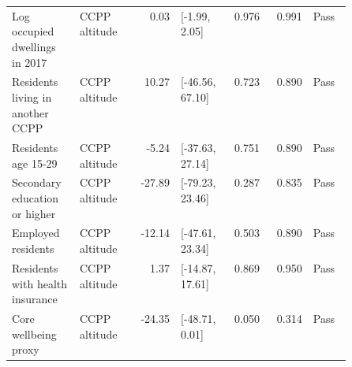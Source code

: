 \begin{longtable}{@{}p{0.20\linewidth}p{0.16\linewidth}rp{0.14\linewidth}rrl@{}}
Log occupied dwellings in 2017 & CCPP altitude & 0.03 & [-1.99, 2.05] & 0.976 & 0.991 & Pass \\
Residents living in another CCPP & CCPP altitude & 10.27 & [-46.56, 67.10] & 0.723 & 0.890 & Pass \\
Residents age 15-29 & CCPP altitude & -5.24 & [-37.63, 27.14] & 0.751 & 0.890 & Pass \\
Secondary education or higher & CCPP altitude & -27.89 & [-79.23, 23.46] & 0.287 & 0.835 & Pass \\
Employed residents & CCPP altitude & -12.14 & [-47.61, 23.34] & 0.503 & 0.890 & Pass \\
Residents with health insurance & CCPP altitude & 1.37 & [-14.87, 17.61] & 0.869 & 0.950 & Pass \\
Core wellbeing proxy & CCPP altitude & -24.35 & [-48.71, 0.01] & 0.050 & 0.314 & Pass \\
\end{longtable}
\endgroup
